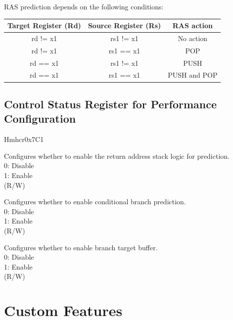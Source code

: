 \documentclass[main\_\_EN.tex]{subfiles}
\begin{document}
RAS prediction depends on the following conditions:

\begin{longtable}{ | c | c | c | }
\hline\rowcolor{lightgray}
Target Register (Rd) & Source Register (Rs) & RAS action \\ \hline
\endfirsthead
\hline
rd != x1 & rs1 != x1 & No action \\ \hline
rd != x1 & rs1 == x1 & POP \\ \hline
rd == x1 & rs1 != x1 & PUSH \\ \hline
rd == x1 & rs1 == x1 & PUSH and POP \\ \hline
\end{longtable}

 \subsection{Control Status Register for Performance Configuration}
\label{sec:riscvcpu-perf-csr}
\begin{register}{H}{mhcr}{0x7C1}\label{regdesc:MHCR}
%
%
%
%
%
%
\regnewline%
\begin{regdesc}\begin{reglist}
\label{fielddesc:MHCRRS}\item [RS] Configures whether to enable the return address stack logic for prediction. \\
0: Disable \\
1: Enable \\
(R/W)
\label{fielddesc:MHCRBPE}\item [BPE] Configures whether to enable conditional branch prediction.\\
0: Disable \\
1: Enable \\
(R/W)
\label{fielddesc:MHCRBTB}\item [BTB] Configures whether to enable branch target buffer.\\
0: Disable \\
1: Enable \\
(R/W)
\end{reglist}\end{regdesc}
\end{register}
\newpage
\section{Custom Features}
\end{document}
